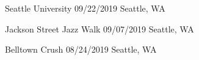 \begin{cventries}

  \cvpresentation
    {} %
    {Seattle University} %
    {09/22/2019 \hspace{2mm} Seattle, WA} %
    {} %
\vspace{-5mm}

  \cvpresentation
    {} %
    {Jackson Street Jazz Walk} %
    {09/07/2019 \hspace{2mm}
    Seattle, WA} %
    {} %
\vspace{-5mm}



  \cvpresentation
    {} %
    {Belltown Crush} %
    {08/24/2019 \hspace{2mm} Seattle, WA} %
    {} %
\vspace{-5mm}




\end{cventries}
